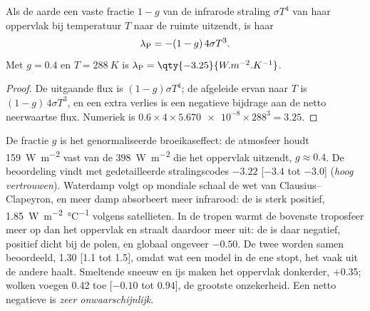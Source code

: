 \begin{proposition}\label{prop:b2:anthropogenic-climate-change:planck}
Als de aarde een vaste fractie $1 - g$ van de infrarode straling $\sigma T^4$ van haar oppervlak bij
temperatuur $T$ naar de ruimte uitzendt, is haar 
\[
  \lambda_{\text P} = -(1 - g)\,4\sigma T^3 .
\]
Met $g = 0.4$ en $T = \qty{288}{K}$ is $\lambda_{\text P} = \qty{-3.25}{W.m^{-2}.K^{-1}}$.
\end{proposition}
\begin{proof}
De uitgaande flux is $(1 - g)\sigma T^4$; de afgeleide ervan naar $T$ is $(1 - g)\,4\sigma
T^3$, en een extra verlies is een negatieve bijdrage aan de netto neerwaartse flux. Numeriek is $0.6
\times 4 \times \num{5.670e-8} \times 288^3 = 3.25$.
\end{proof}

De fractie $g$ is het genormaliseerde broeikaseffect: de atmosfeer houdt \qty{159}{W.m^{-2}} vast van
de \qty{398}{W.m^{-2}} die het oppervlak uitzendt, $g \approx 0.4$. De beoordeling vindt met gedetailleerde
stralingscodes $-3.22$ [$-3.4$ tot $-3.0$] (\emph{hoog vertrouwen}). Waterdamp volgt
op mondiale schaal de wet van Clausius--Clapeyron, en meer damp absorbeert meer infrarood: de
 is sterk positief, \qty{1.85}{W.m^{-2}.\celsius^{-1}} volgens satellieten.
In de tropen warmt de bovenste troposfeer meer op dan het oppervlak en straalt daardoor meer uit: de
 is daar negatief, positief dicht bij de polen, en globaal ongeveer $-0.50$. De twee
worden samen beoordeeld, \num{1.30} [1.1 tot 1.5], omdat wat een model in de ene stopt, het vaak
uit de andere haalt. Smeltende sneeuw en ijs maken het oppervlak donkerder, +0.35; wolken voegen \num{0.42}
toe [$-0.10$ tot $0.94$], de grootste onzekerheid. Een netto negatieve  is \emph{zeer onwaarschijnlijk}.

